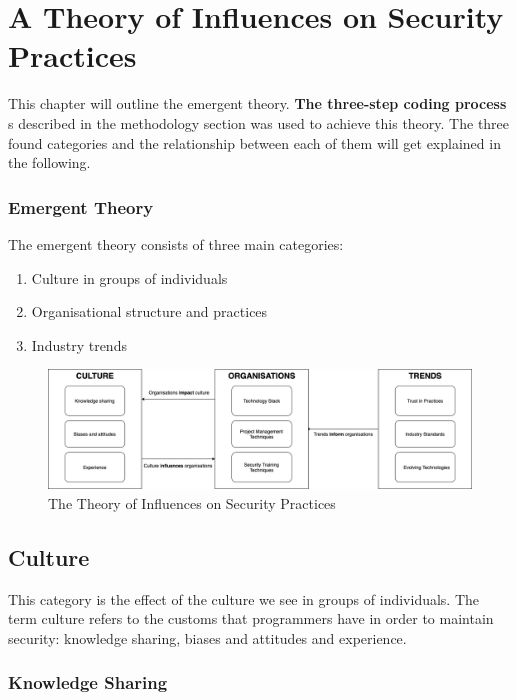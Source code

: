 \chapter{A Theory of Influences on Security Practices}\label{C:Emergent Theory}

This chapter will outline the emergent theory. \textbf{The three-step coding process }s described in the methodology section was used to achieve this theory. The three found categories and the relationship between each of them will get explained in the following.

\subsection{Emergent Theory}

The emergent theory consists of three main categories:

\begin{enumerate}
\item  Culture in groups of individuals
\item Organisational structure and practices
\item Industry trends
\end{enumerate}

\begin{figure}[ht]
\includegraphics[width=17cm]{figures/fig2.png}
\centering
\caption{The Theory of Influences on Security Practices}
\centering
\end{figure}

\section{Culture}

This category is the effect of the culture we see in groups of individuals. The term culture refers to the customs that programmers have in order to maintain security: knowledge sharing, biases and attitudes and experience. 

\subsection{Knowledge Sharing}

